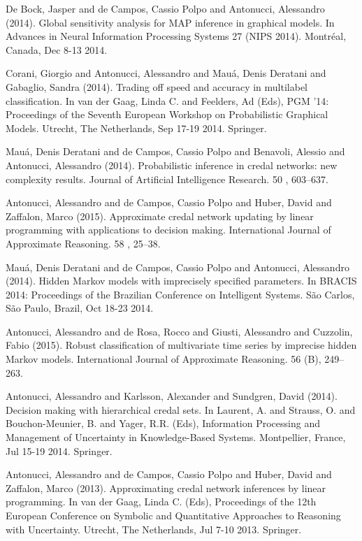 \begin{cventries}
\begin{cvitems}
\item De Bock, Jasper and de Campos, Cassio Polpo and Antonucci, Alessandro (2014).   Global sensitivity analysis for MAP inference in graphical models.   In Advances in Neural Information Processing Systems 27 (NIPS 2014).   Montréal, Canada,   Dec 8-13 2014.
\item Corani, Giorgio and Antonucci, Alessandro and Mauá, Denis Deratani and Gabaglio, Sandra (2014).   Trading off speed and accuracy in multilabel classification.   In van der Gaag, Linda C. and Feelders, Ad (Eds), PGM ’14: Proceedings of the Seventh European Workshop on Probabilistic Graphical Models.   Utrecht, The Netherlands,   Sep 17-19 2014.   Springer.
\item Mauá, Denis Deratani and de Campos, Cassio Polpo and Benavoli, Alessio and Antonucci, Alessandro (2014).   Probabilistic inference in credal networks: new complexity results.   Journal of Artificial Intelligence Research. 50 , 603–637.
\item Antonucci, Alessandro and de Campos, Cassio Polpo and Huber, David and Zaffalon, Marco (2015).   Approximate credal network updating by linear programming with applications to decision making.   International Journal of Approximate Reasoning. 58 , 25–38.
\item Mauá, Denis Deratani and de Campos, Cassio Polpo and Antonucci, Alessandro (2014).   Hidden Markov models with imprecisely specified parameters.   In BRACIS 2014: Proceedings of the Brazilian Conference on Intelligent Systems.   São Carlos, São Paulo, Brazil,   Oct 18-23 2014.
\item Antonucci, Alessandro and de Rosa, Rocco and Giusti, Alessandro and Cuzzolin, Fabio (2015).   Robust classification of multivariate time series by imprecise hidden Markov models.   International Journal of Approximate Reasoning. 56 (B), 249–263.
\item Antonucci, Alessandro and Karlsson, Alexander and Sundgren, David (2014).   Decision making with hierarchical credal sets.   In Laurent, A. and Strauss, O. and Bouchon-Meunier, B. and Yager, R.R. (Eds), Information Processing and Management of Uncertainty in Knowledge-Based Systems.   Montpellier, France,   Jul 15-19 2014.   Springer.
\item Antonucci, Alessandro and de Campos, Cassio Polpo and Huber, David and Zaffalon, Marco (2013).   Approximating credal network inferences by linear programming.   In van der Gaag, Linda C. (Eds), Proceedings of the 12th European Conference on Symbolic and Quantitative Approaches to Reasoning with Uncertainty.   Utrecht, The Netherlands,   Jul 7-10 2013.   Springer.

\end{cvitems}
\end{cventries}
